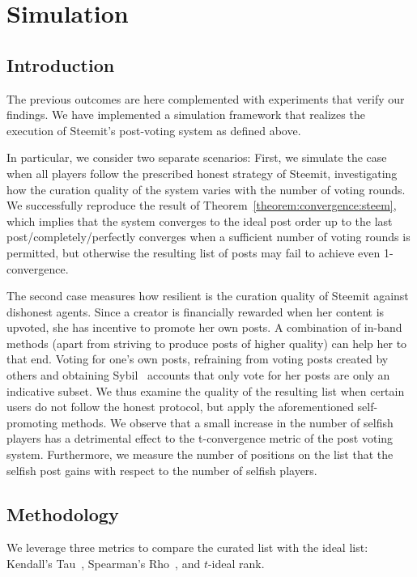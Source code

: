 \section{Simulation}
  \subsection{Introduction}
    The previous outcomes are here complemented with experiments that verify our
    findings. We have implemented a simulation framework that realizes the
    execution of Steemit's post-voting system as defined above.

    In particular, we consider two separate scenarios: First, we simulate the
    case when all players follow the prescribed honest strategy of Steemit,
    investigating how the curation quality of the system varies with the number
    of voting rounds. We successfully reproduce the result of
    Theorem~\ref{theorem:convergence:steem}, which implies that the system
    converges to the ideal post order up to the last post/completely/perfectly
    converges when a sufficient number of voting rounds is permitted, but
    otherwise the resulting list of posts may fail to achieve even
    1-convergence.

    The second case measures how resilient is the curation quality of Steemit
    against dishonest agents. Since a creator is financially rewarded when her
    content is upvoted, she has incentive to promote her own posts. A
    combination of in-band methods (apart from striving to produce posts of
    higher quality) can help her to that end. Voting for one's own posts,
    refraining from voting posts created by others and obtaining
    Sybil~\cite{sybilattack} accounts that only vote for her posts are only an
    indicative subset. We thus examine the quality of the resulting list when
    certain users do not follow the honest protocol, but apply the
    aforementioned self-promoting methods. We observe that a small increase in
    the number of selfish players has a detrimental effect to the t-convergence
    metric of the post voting system. Furthermore, we measure the number of
    positions on the list that the selfish post gains with respect to the number
    of selfish players.

  \subsection{Methodology}
    We leverage three metrics to compare the curated list with the ideal list:
    Kendall's Tau~\cite{kendall1955rank}, Spearman's
    Rho~\cite{spearman1904proof}, and $t$-ideal rank.


